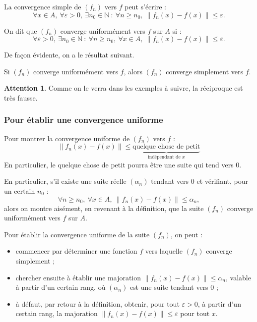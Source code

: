 \documentclass[french]{article}
\newcommand{\N}{\mathbb{N}}
\theoremstyle{plain}
\theoremstyle{definition}
\newtheorem*{attention}{Attention}
\theoremstyle{remark}
\begin{document}
La convergence simple de $(f_n)$ vers $f$ peut s'écrire :
$$\forall x\in A,\ \forall\varepsilon>0,\ \exists n_0\in\N\ :\ \forall n\geqslant n_0,\ \lVert f_n(x)-f(x)\rVert\leqslant\varepsilon.$$

\begin{dfn}
	On dit que $(f_n)$ converge uniformément vers $f$ sur $A$ si :
	$$\forall\varepsilon>0,\ \exists n_0\in\N\ :\ \forall n\geqslant n_0,\ \forall x\in A,\ \lVert f_n(x)-f(x)\rVert\leqslant\varepsilon.$$
\end{dfn}

De façon évidente, on a le résultat suivant.

\begin{prop}%
	Si $(f_n)$ converge uniformément vers $f$, alors $(f_n)$ converge simplement vers $f$.
\end{prop}

\begin{attention}
	Comme on le verra dans les exemples à suivre, la réciproque est très fausse.
\end{attention}

\subsubsection*{Pour établir une convergence uniforme}

\begin{met}
	Pour montrer la convergence uniforme de $(f_n)$ vers $f$ : $$\lVert f_n(x)-f(x)\rVert\leqslant\underbrace{\text{quelque chose de petit}}_{\text{indépendant de }x}$$ En particulier, le quelque chose de petit pourra être une suite qui tend vers $0$.
\end{met}

En particulier, s'il existe une suite réelle $(\alpha_n)$ tendant vers $0$ et vérifiant, pour un certain $n_0$ :
$$\forall n\geqslant n_0,\ \forall x\in A,\ \lVert f_n(x)-f(x)\rVert\leqslant\alpha_n,$$ alors on montre aisément, en revenant à la définition, que la suite $(f_n)$ converge uniformément vers $f$ sur $A$.

\begin{met}
	Pour établir la convergence uniforme de la suite $(f_n)$, on peut :
	\begin{itemize}
		\item commencer par déterminer une fonction $f$ vers laquelle $(f_n)$ converge simplement ;
		\item chercher ensuite à établir une majoration $\lVert f_n(x)-f(x)\rVert\leqslant \alpha_n$, valable à partir d'un certain rang, où $(\alpha_n)$ est une suite tendant vers $0$ ;
		\item à défaut, par retour à la définition, obtenir, pour tout $\varepsilon>0$, à partir d'un certain rang, la majoration $\lVert f_n(x)-f(x)\rVert\leqslant\varepsilon$ pour tout $x$.
	\end{itemize}
\end{met}
\end{document}
